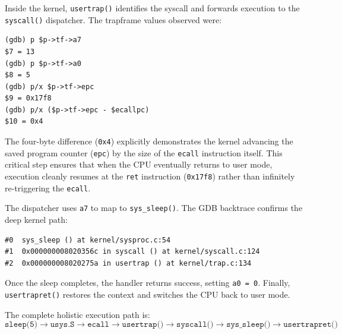 \documentclass[11pt,a4paper]{article}
\begin{document}
Inside the kernel, \texttt{usertrap()} identifies the syscall and forwards execution to the \texttt{syscall()} dispatcher. The trapframe values observed were:
\begin{verbatim}
(gdb) p $p->tf->a7
$7 = 13
(gdb) p $p->tf->a0
$8 = 5
(gdb) p/x $p->tf->epc
$9 = 0x17f8
(gdb) p/x ($p->tf->epc - $ecallpc)
$10 = 0x4
\end{verbatim}

The four-byte difference (\texttt{0x4}) explicitly demonstrates the kernel advancing the saved program counter (\texttt{epc}) by the size of the \texttt{ecall} instruction itself. This critical step ensures that when the CPU eventually returns to user mode, execution cleanly resumes at the \texttt{ret} instruction (\texttt{0x17f8}) rather than infinitely re-triggering the \texttt{ecall}.

The dispatcher uses \texttt{a7} to map to \texttt{sys\_sleep()}. The GDB backtrace confirms the deep kernel path:
\begin{verbatim}
#0  sys_sleep () at kernel/sysproc.c:54
#1  0x000000008020356c in syscall () at kernel/syscall.c:124
#2  0x000000008020275a in usertrap () at kernel/trap.c:134
\end{verbatim}

Once the sleep completes, the handler returns success, setting \texttt{a0 = 0}. Finally, \texttt{usertrapret()} restores the context and switches the CPU back to user mode.

The complete holistic execution path is:
\[
\texttt{sleep(5)} \rightarrow \texttt{usys.S} \rightarrow \texttt{ecall} \rightarrow \texttt{usertrap()} \rightarrow \texttt{syscall()} \rightarrow \texttt{sys\_sleep()} \rightarrow \texttt{usertrapret()}
\]
\end{document}
